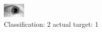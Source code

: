 \begin{figure}[h!]
\begin{center}
\includegraphics[width=0.60\columnwidth]{figures/ID1550_class_2_target_1.png}
\end{center}
\caption{ Classification: 2 actual target: 1}
\label{fig:ID1550_class_2_target_1}
\end{figure}
